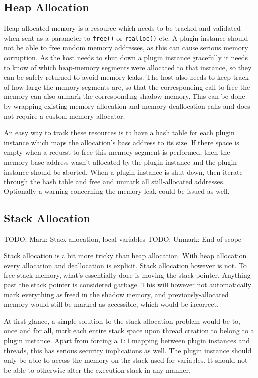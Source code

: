 \subsection {Heap Allocation}

Heap-allocated memory is a resource which needs to be tracked and validated when
sent as a parameter to \texttt{free()} or \texttt{realloc()} etc.
A plugin instance should not be able to free random memory addresses, as this
can cause serious memory corruption.
As the host needs to shut down a plugin instance gracefully it needs to know of
which heap-memory segments were allocated to that instance, so they can be
safely returned to avoid memory leaks.
The host also needs to keep track of how large the memory segments are, so that
the corresponding call to free the memory can also unmark the corresponding
shadow memory.
This can be done by wrapping existing memory-allocation and memory-deallocation
calls and does not require a custom memory allocator.

An easy way to track these resources is to have a hash table for each plugin
instance which maps the allocation's base address to its size.
If there space is empty when a request to free this memory segment is performed,
then the memory base address wasn't allocated by the plugin instance and the
plugin instance should be aborted.
When a plugin instance is shut down, then iterate through the hash table and
free and unmark all still-allocated addresses.
Optionally a warning concerning the memory leak could be issued as well.

\subsection {Stack Allocation}

TODO: Mark: Stack allocation, local variables
TODO: Unmark: End of scope

Stack allocation is a bit more tricky than heap allocation.
With heap allocation every allocation and deallocation is explicit. Stack
allocation however is not.
To free stack memory, what's essentially done is moving the stack pointer.
Anything past the stack pointer is considered garbage.
This will however not automatically mark everything as freed in the shadow
memory, and previously-allocated memory would still be marked as accessible,
which would be incorrect.

At first glance, a simple solution to the stack-allocation problem would be to,
once and for all, mark each entire stack space upon thread creation to belong to
a plugin instance.
Apart from forcing a $1:1$ mapping between plugin instances and threads, this
has serious security implications as well.
The plugin instance should only be able to access the memory on the stack used
for variables.
It should not be able to otherwise alter the execution stack in any manner.

